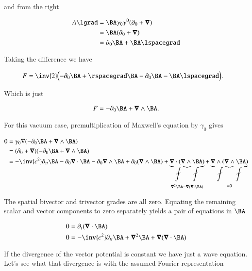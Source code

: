 and from the right

\begin{align*}
A \lgrad
&= 
\BA \gamma_0 \gamma^0 ( \partial_0 + \spacegrad ) \\
&= 
\BA ( \partial_0 + \spacegrad ) \\
&= 
\partial_0 \BA 
+ \BA \lspacegrad 
\end{align*}

Taking the difference we have

\begin{align*}
F 
&= 
\inv{2} \Bigl( -\partial_0 \BA + \rspacegrad \BA -  \partial_0 \BA - \BA \lspacegrad \Bigr).
\end{align*}

Which is just

\begin{align}\label{eqn:fourierMaxVac:44}
F = -\partial_0 \BA + \spacegrad \wedge \BA.
\end{align}

For this vacuum case, premultiplication of Maxwell's equation by $\gamma_0$ gives

\begin{align*}
0 
&= \gamma_0 \grad ( -\partial_0 \BA + \spacegrad \wedge \BA ) \\
&= (\partial_0 + \spacegrad)( -\partial_0 \BA + \spacegrad \wedge \BA ) \\
&= -\inv{c^2} \partial_{tt} \BA 
- \partial_0 \spacegrad \cdot \BA 
- \partial_0 \spacegrad \wedge \BA 
+ \partial_0 ( \spacegrad \wedge \BA ) 
+ \underbrace{\spacegrad \cdot ( \spacegrad \wedge \BA ) }_{\spacegrad^2 \BA - \spacegrad (\spacegrad \cdot \BA)}
+ \underbrace{\spacegrad \wedge ( \spacegrad \wedge \BA )}_{=0} \\
\end{align*}

The spatial bivector and trivector grades are all zero.  Equating the remaining scalar and vector components to zero separately yields a pair of equations in $\BA$

\begin{subequations}
\label{eqn:fourierMaxVac:45}
\begin{align}
0 &= \partial_t (\spacegrad \cdot \BA) \\
0 &= -\inv{c^2} \partial_{tt} \BA + \spacegrad^2 \BA + \spacegrad (\spacegrad \cdot \BA) 
\end{align}
\end{subequations}

If the divergence of the vector potential is constant we have just a wave equation.  Let's see what that divergence is with the assumed Fourier representation

